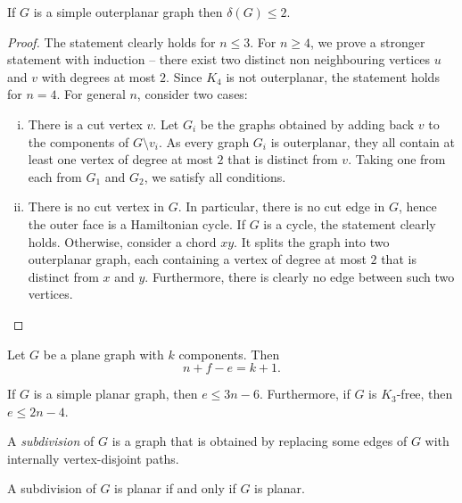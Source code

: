 \begin{izrek}
If $G$ is a simple outerplanar graph then $\delta(G) \leq 2$.
\end{izrek}

\begin{proof}
The statement clearly holds for $n \leq 3$. For $n \geq 4$, we
prove a stronger statement with induction -- there exist two
distinct non neighbouring vertices $u$ and $v$ with degrees at most
$2$. Since $K_4$ is not outerplanar, the statement holds for $n=4$.
For general $n$, consider two cases:

\begin{enumerate}[i)]
\item There is a cut vertex $v$. Let $G_i$ be the graphs obtained
by adding back $v$ to the components of $G \setminus v_i$. As every
graph $G_i$ is outerplanar, they all contain at least one vertex of
degree at most $2$ that is distinct from $v$. Taking one from each
from $G_1$ and $G_2$, we satisfy all conditions.

\item There is no cut vertex in $G$. In particular, there is no cut
edge in $G$, hence the outer face is a Hamiltonian cycle. If $G$ is
a cycle, the statement clearly holds. Otherwise, consider a chord
$xy$. It splits the graph into two outerplanar graph, each
containing a vertex of degree at most $2$ that is distinct from $x$
and $y$. Furthermore, there is clearly no edge between such two
vertices. \qedhere
\end{enumerate}
\end{proof}

\begin{izrek}
Let $G$ be a plane graph with $k$ components. Then
\[
n + f - e = k+1.
\]
\end{izrek}

\begin{opomba}
If $G$ is a simple planar graph, then $e \leq 3n - 6$. Furthermore,
if $G$ is $K_3$-free, then $e \leq 2n - 4$.
\end{opomba}


\begin{definicija}
A \emph{subdivision} of $G$ is a graph that is
obtained by replacing some edges of $G$ with internally
vertex-disjoint paths.
\end{definicija}

\begin{opomba}
A subdivision of $G$ is planar if and only if $G$ is planar.
\end{opomba}

